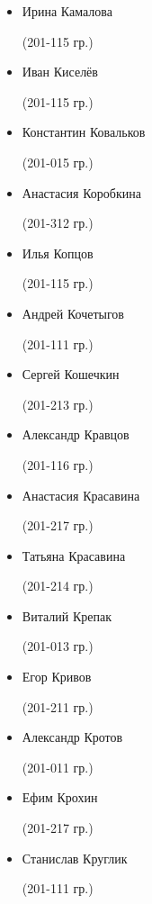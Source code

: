 \begin{multicols}{2}
\begin{small}
\begin{itemize}[leftmargin=*]
	\item[] Ирина Камалова\begin{tiny} (201-115 гр.)\end{tiny}
	\item[] Иван Киселёв\begin{tiny} (201-115 гр.)\end{tiny}
	\item[] Константин Ковальков\begin{tiny} (201-015 гр.)\end{tiny}
	\item[] Анастасия Коробкина\begin{tiny} (201-312 гр.)\end{tiny} %
	\item[] Илья Копцов\begin{tiny} (201-115 гр.)\end{tiny} %
	\item[] Андрей Кочетыгов\begin{tiny} (201-111 гр.)\end{tiny} %
	\item[] Сергей Кошечкин\begin{tiny} (201-213 гр.)\end{tiny}
	\item[] Александр Кравцов\begin{tiny} (201-116 гр.)\end{tiny}
	\item[] Анастасия Красавина\begin{tiny} (201-217 гр.)\end{tiny}
	\item[] Татьяна Красавина\begin{tiny} (201-214 гр.)\end{tiny} %
	\item[] Виталий Крепак\begin{tiny} (201-013 гр.)\end{tiny}
	\item[] Егор Кривов\begin{tiny} (201-211 гр.)\end{tiny}
	\item[] Александр Кротов\begin{tiny} (201-011 гр.)\end{tiny}
	\item[] Ефим Крохин\begin{tiny} (201-217 гр.)\end{tiny}
	\item[] Станислав Круглик\begin{tiny} (201-111 гр.)\end{tiny}

\end{itemize}
\end{small}
\end{multicols}
